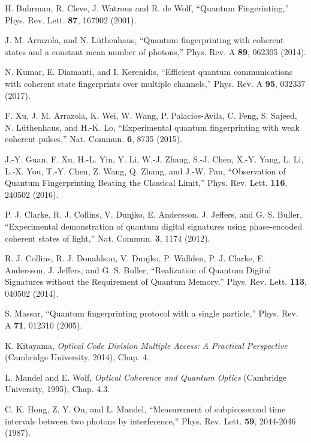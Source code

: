 \documentclass[10pt]{article}
\begin{document}
\begin{thebibliography}{99}

 H. Buhrman, R. Cleve, J. Watrous and R. de Wolf, ``Quantum Fingerinting,'' Phys. Rev. Lett.  {\bf 87}, 167902 (2001).

 J. M. Arrazola, and N. L\"{u}thenhaus, ``Quantum fingerprinting with coherent states and a constant mean number of photons,'' Phys. Rev. A {\bf 89}, 062305 (2014).

 N. Kumar, E. Diamanti, and I. Kerenidis, ``Efficient quantum communications with coherent state
fingerprints over multiple channels,'' Phys. Rev. A {\bf 95}, 032337 (2017).

 F. Xu, J. M. Arrazola, K. Wei, W. Wang, P. Palacios-Avila, C. Feng, S. Sajeed, N. L\"{u}thenhaus, and H.-K. Lo, ``Experimental quantum fingerprinting with weak coherent pulses,'' Nat. Commun. {\bf 6}, 8735 (2015).

 J.-Y. Guan, F. Xu, H.-L. Yin, Y. Li, W.-J. Zhang, S.-J. Chen, X.-Y. Yang, L. Li, L.-X. You, T.-Y. Chen, Z. Wang, Q. Zhang, and J.-W. Pan, ``Observation of Quantum Fingerprinting Beating the Classical Limit,'' Phys. Rev. Lett.
{\bf 116}, 240502 (2016).

 P. J. Clarke, R. J. Collins, V. Dunjko, E. Andersson, J. Jeffers, and G. S. Buller, ``Experimental demonstration of quantum digital signatures using phase-encoded coherent states of light,'' Nat. Commun. {\bf 3}, 1174 (2012).

 R. J. Collins, R. J. Donaldson, V. Dunjko, P. Wallden, P. J. Clarke, E. Andersson, J. Jeffers, and G. S. Buller, ``Realization of Quantum Digital Signatures without the Requirement of Quantum Memory,'' Phys. Rev. Lett. {\bf 113}, 040502 (2014).

 S. Massar, ``Quantum fingerprinting protocol with a single particle,'' Phys. Rev. A {\bf 71}, 012310 (2005).


 K. Kitayama, \textit{Optical Code Division Multiple Access: A Practical Perspective} (Cambridge University, 2014), Chap. 4.

  L. Mandel and E. Wolf, \textit{Optical Coherence and Quantum Optics} (Cambridge University, 1995), Chap. 4.3.

 C. K. Hong, Z. Y. Ou, and L. Mandel, ``Measurement of subpicosecond time intervals between two photons by interference,'' Phys. Rev. Lett. {\bf 59}, 2044-2046 (1987).


\end{thebibliography}
\end{document}
